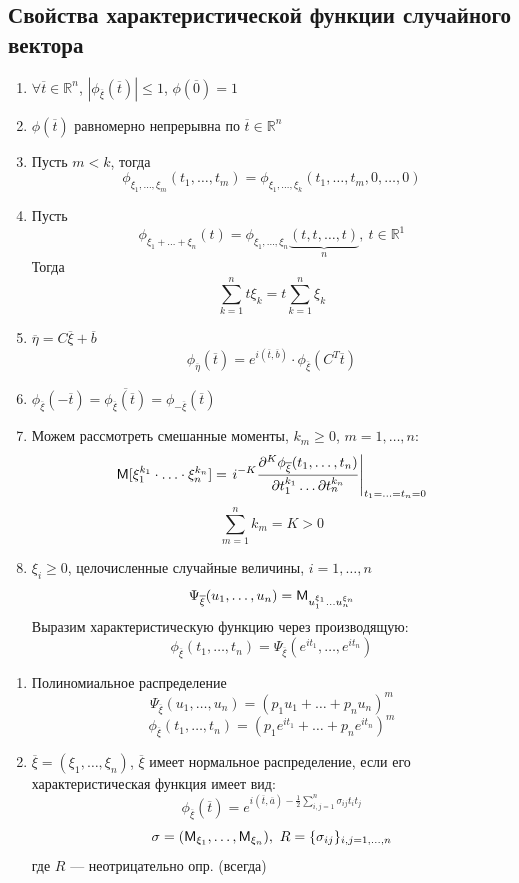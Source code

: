 \subsection{Свойства характеристической функции случайного вектора}
\begin{enumerate}
	\item $\forall \overline{t} \in \mathbb{R}^n$, $|\phi_{\overline{\xi}} (\overline{t}) | \leqslant 1$, $\phi (\overline{0}) = 1$
	\item $\phi(\overline{t})$ равномерно непрерывна по $\overline{t} \in \mathbb{R}^n$
	\item Пусть $m < k$, тогда
\[
	\phi_{\xi_1, \ldots, \xi_m} (t_1, \ldots, t_m) = \phi_{\xi_1, \ldots, \xi_k} (t_1, \ldots, t_m, 0, \ldots, 0)
\]
	\item Пусть 
	\[
		\phi_{\xi_1 + \ldots + \xi_n} (t) = \phi_{\xi_1, \ldots, \xi_n} \underbrace{(t, t, \ldots, t)}_{n}, \ t \in \mathbb{R}^1
	\]
	Тогда
	\[
		\sum\limits_{k = 1}^{n} t \xi_k = t \sum\limits_{k = 1}^{n} \xi_k
	\]
	\item $\overline{\eta} = C \overline{\xi} + \overline{b}$
	\[
		\phi_{\overline{\eta}} (\overline{t}) = e^{i(\overline{t}, \overline{b})} \cdot \phi_{\overline{\xi}} (C^T \overline{t})
	\]
	\item $\phi_{\overline{\xi}} (- \overline{t}) = \overline{\phi_{\overline{\xi}}(\overline{t})} = \phi_{- \overline{\xi}} (\overline{t})$
	\item Можем рассмотреть смешанные моменты, $k_m \geqslant 0$, $m = 1, \ldots, n$:
	\[
		\mathsf{M} [\xi_1^{k_1} \cdot \ldots \cdot \xi_n^{k_n}] = \left. i^{-K} \frac{\partial^K \phi_{\overline{\xi}} (t_1, \ldots, t_n)}{\partial t_1^{k_1} \ldots \partial t_n^{k_n}} \right|_{t_1 = \ldots = t_n = 0}
	\]
	\[
		\sum\limits_{m = 1}^{n} k_m = K > 0
	\]
	\item $\xi_i \geqslant 0$, целочисленные случайные величины, $i = 1, \ldots, n$
	\[
		\Psi_{\overline{\xi}} (u_1, \ldots, u_n) = \mathsf{M}_{u_1^{\xi_1} \ldots u_n^{\xi_n}}
	\]
	Выразим характеристическую функцию через производящую:
	\[
		\phi_{\overline{\xi}} (t_1, \ldots, t_n) = \Psi_{\overline{\xi}} (e^{it_1}, \ldots, e^{it_n})
	\]
\end{enumerate}
\begin{example}
	\begin{enumerate}
		\item Полиномиальное распределение 
		\[
			\Psi_{\overline{\xi}} (u_1, \ldots, u_n) = (p_1 u_1 + \ldots + p_n u_n)^m
		\]
		\[
			\phi_{\overline{\xi}} (t_1, \ldots, t_n) = (p_1 e^{it_1} + \ldots + p_n e^{it_n})^m
		\]
		\item $\overline{\xi} = (\xi_1, \ldots, \xi_n)$, $\overline{\xi}$ имеет нормальное распределение, если его характеристическая функция имеет вид:
	\[
		\phi_{\overline{\xi}} (\overline{t}) = e^{i(\overline{t}, \overline{a}) - \frac{1}{2} \sum\limits_{i, j = 1}^{n} \sigma_{ij} t_i t_j}
	\]
	\[
		\sigma = (\mathsf{M}_{\xi_1}, \ldots, \mathsf{M}_{\xi_n} ), \ R = \{ \sigma_{ij} \}_{i, j = 1, \ldots, n}
	\]
	где $R$ --- неотрицательно опр. (всегда)
	\end{enumerate}
\end{example}

